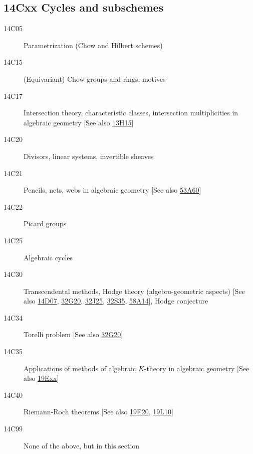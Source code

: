 \documentclass[letterpaper]{article}
\begin{document}
\subsection*{14Cxx Cycles and subschemes }\label{14Cxx}
\begin{description}               
\item [14C05]\label{14C05} Parametrization (Chow and Hilbert schemes)
\item [14C15]\label{14C15} (Equivariant) Chow groups and rings; motives
\item [14C17]\label{14C17} Intersection theory, characteristic classes, intersection multiplicities in algebraic geometry [See also \hyperref[13H15]{13H15}]
\item [14C20]\label{14C20} Divisors, linear systems, invertible sheaves
\item [14C21]\label{14C21} Pencils, nets, webs in algebraic geometry [See also \hyperref[53A60]{53A60}]
\item [14C22]\label{14C22} Picard groups
\item [14C25]\label{14C25} Algebraic cycles
\item [14C30]\label{14C30} Transcendental methods, Hodge theory (algebro-geometric aspects) [See also \hyperref[14D07]{14D07}, \hyperref[32G20]{32G20}, \hyperref[32J25]{32J25}, \hyperref[32S35]{32S35}, \hyperref[58A14]{58A14}], Hodge conjecture
\item [14C34]\label{14C34} Torelli problem [See also \hyperref[32G20]{32G20}]
\item [14C35]\label{14C35} Applications of methods of algebraic $K$-theory in algebraic geometry [See also \hyperref[19Exx]{19Exx}]
\item [14C40]\label{14C40} Riemann-Roch theorems [See also \hyperref[19E20]{19E20}, \hyperref[19L10]{19L10}]
\item [14C99]\label{14C99} None of the above, but in this section
\end{description}          
\end{document}
